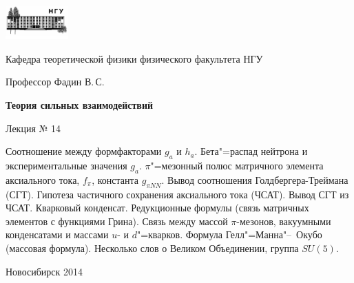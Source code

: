 \documentclass[12pt,pagesize,paper=192mm:108mm]{scrbook}
\begin{document}
\begin{titlepage}
  \vspace*{-1em}
  \begin{center}
    \includegraphics[width=0.18\textwidth]{../NSU-logo}

    Кафедра теоретической физики физического факультета НГУ
    \medskip

    \Large
    Профессор Фадин В.\,С.

    \huge
    \textbf{Теория сильных взаимодействий}
    \smallskip
    
    \Large
    Лекция № 14
    \vfill
    
    \normalsize
    \begin{minipage}{0.9\linewidth}
      Соотношение между формфакторами $g_a$ и $h_a$. Бета"=распад
      нейтрона и экспериментальные значения $g_a$. $\pi$"=мезонный
      полюс матричного элемента аксиального тока, $f_{\pi}$, константа
      $g_{\pi NN}$. Вывод соотношения Голдбергера-Треймана (СГТ). Гипотеза
      частичного сохранения аксиального тока (ЧСАТ). Вывод СГТ из
      ЧСАТ. Кварковый конденсат. Редукционные формулы (связь матричных
      элементов с функциями Грина). Связь между массой $\pi$-мезонов,
      вакуумными конденсатами и массами $u$- и $d$"=кварков. Формула
      Гелл"=Манна"--~Окубо (массовая формула). Несколько слов о Великом
      Объединении, группа $SU(5)$.
    \end{minipage}
    \vfill
    
    \normalsize \ccbysa\hspace{0.5em}  Новосибирск 2014   
  \end{center}
\end{titlepage}
\end{document}
